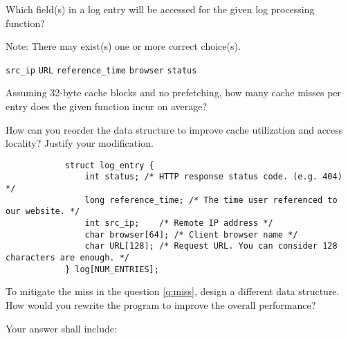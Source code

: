 \begin{questions}

\question[2] Which field(s) in a log entry will be accessed for the
given log processing function?

{
    \begin{solution}
        Note: There may exist(s) one or more correct choice(s).\\
        \begin{oneparcheckboxes}
            \choice \texttt{src\_ip}
            \choice \texttt{URL}
            \choice \texttt{reference\_time}
            \choice \texttt{browser}
            \choice \texttt{status}
        \end{oneparcheckboxes}
    \end{solution}
}

\question[1] Assuming 32-byte cache blocks and no prefetching, how
many cache misses per entry does the given function incur on average? \label{q:miss}

{
    \begin{solution}
        \fillin[][4in]
    \end{solution}
}

\question[3] How can you reorder the data structure to improve
cache utilization and access locality? Justify your modification.

{
    \begin{solution}
        \vspace{1in}
        \begin{verbatim}
            struct log_entry {
                int status; /* HTTP response status code. (e.g. 404) */
                long reference_time; /* The time user referenced to our website. */
                int src_ip;    /* Remote IP address */
                char browser[64]; /* Client browser name */
                char URL[128]; /* Request URL. You can consider 128 characters are enough. */
            } log[NUM_ENTRIES];
        \end{verbatim}
    \end{solution}
}

\newpage

\question[6] To mitigate the miss in the question \ref{q:miss},
design a different data structure. How would you rewrite the
program to improve the overall performance?

Your answer shall include:


\end{questions}
